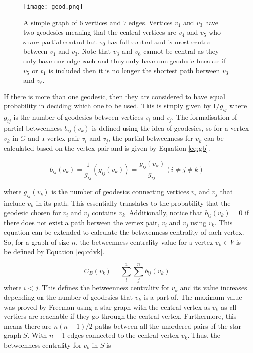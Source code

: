 \begin{figure}[!htb]
	\centering
	\texttt{[image: geod.png]}
	\caption{A simple graph of 6 vertices and 7 edges. Vertices $v_1$ and $v_3$ have two geodesics meaning that the central vertices are $v_4$ and $v_5$ who share partial control but $v_0$ has full control and is most central between $v_1$ and $v_3$. Note that $v_3$ and $v_6$ cannot be central as they only have one edge each and they only have one geodesic because if $v_5$ or $v_1$ is included then it is no longer the shortest path between $v_3$ and $v_6$.}
	\label{fig:geodesics}
\end{figure}

If there is more than one geodesic, then they are considered to have equal probability in deciding which one to be used. This is simply given by $1/g_{ij}$ where $g_{ij}$ is the number of geodesics between vertices $v_i$ and $v_j$. The formalisation of partial betweenness $b_{ij}(v_k)$ is defined using the idea of geodesics, so for a vertex $v_k$ in $G$ and a vertex pair $v_i$ and $v_j$, the partial betweenness for $v_k$ can be calculated based on the vertex pair and is given by Equation \ref{eq:gb}.

\begin{equation} \label{eq:gb}
b_{ij}(v_k) = \frac{1}{g_{ij}}(g_{ij}(v_k)) = \frac{g_{ij}(v_k)}{g_{ij}} (i \ne j \ne k)
\end{equation}

where $g_{ij}(v_k)$ is the number of geodesics connecting vertices $v_i$ and $v_j$ that include $v_k$ in its path. This essentially translates to the probability that the geodesic chosen for $v_i$ and $v_j$ contains $v_k$. Additionally, notice that $b_{ij}(v_k) = 0$ if there does not exist a path between the vertex pair, $v_i$ and $v_j$ using $v_k$.
This equation can be extended to calculate the betweenness centrality of each vertex. So, for a graph of size $n$, the betweenness centrality value for a vertex $v_k \in V$ is be defined by Equation \ref{eq:cdvk}.

\begin{equation}\label{eq:cdvk}
C_B(v_k)= \sum_i^n\sum_j^n b_{ij}(v_k)
\end{equation}
where $i < j$. This defines the betweenness centrality for $v_k$ and its value increases depending on the number of geodesics that $v_k$ is a part of. The maximum value \cite{freeman2002centrality} was proved by Freeman using a star graph with the central vertex as $v_k$ as all vertices are reachable if they go through the central vertex. Furthermore, this means there are $n(n-1)/2$ paths between all the unordered pairs of the star graph $S$. With $n-1$ edges connected to the central vertex $v_k$. Thus, the betweenness centrality for $v_k$ in $S$ is

